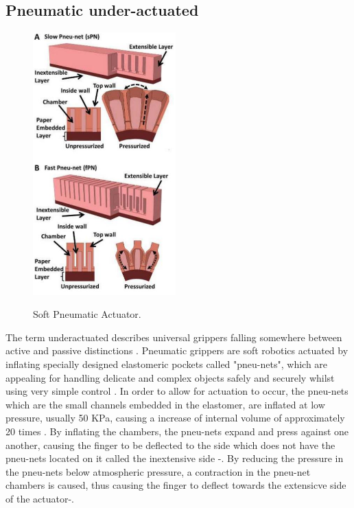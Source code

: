 \documentclass[11pt]{article}
\begin{document}
\subsection{Pneumatic under-actuated}
\begin{figure}
\begin{center}
\caption{Soft Pneumatic Actuator.}
\includegraphics[width=5.5cm]{Pneumatic1}
\label{pneumatic1}
\end{center}
\end{figure} 
The term underactuated describes universal grippers falling somewhere between active and passive distinctions \cite{amend2012positive}. Pneumatic grippers are soft robotics actuated by inflating specially designed elastomeric pockets called "pneu-nets", which are appealing for handling delicate and complex objects safely and securely whilst using very simple control \cite{mosadegh2014pneumatic}. In order to allow for actuation to occur, the pneu-nets which are the small channels embedded in the elastomer, are inflated at low pressure, usually 50 KPa, causing a increase of internal volume of approximately 20 times \cite{mosadegh2014pneumatic}. By inflating the chambers, the pneu-nets expand and press against one another, causing the finger to be deflected to the side which does not have the pneu-nets located on it called the inextensive side \cite{ilievski2011soft}-\cite{marchese2015recipe}. By reducing the pressure in the pneu-nets below atmospheric pressure, a contraction in the pneu-net chambers is caused, thus causing the finger to deflect towards the extensicve side of the actuator\cite{ilievski2011soft}-\cite{marchese2015recipe}.
\end{document}
